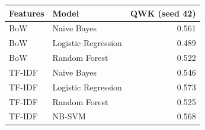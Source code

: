 \begin{tabular}{llr}
\toprule
Features & Model & QWK (seed 42) \\
\midrule
BoW & Naive Bayes & 0.561 \\
BoW & Logistic Regression & 0.489 \\
BoW & Random Forest & 0.522 \\
TF-IDF & Naive Bayes & 0.546 \\
TF-IDF & Logistic Regression & 0.573 \\
TF-IDF & Random Forest & 0.525 \\
TF-IDF & NB-SVM & 0.568 \\
\bottomrule
\end{tabular}%
